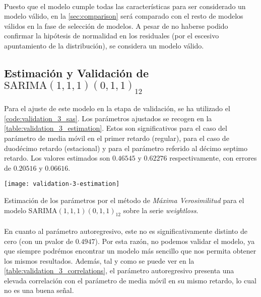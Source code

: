 \documentclass[a4paper, spanish]{article}
\begin{document}
      \paragraph{}
      Puesto que el modelo cumple todas las características para ser considerado un modelo válido, en la \autoref{sec:comparison} será comparado con el resto de modelos válidos en la fase de selección de modelos. A pesar de no haberse podido confirmar la hipótesis de normalidad en los residuales (por el escesivo apuntamiento de la distribución), se considera un modelo válido.

    \subsection{Estimación y Validación de \textbf{$\text{SARIMA}(1, 1, 1)(0, 1, 1)_{12}$}}
    \label{sec:fitting_3}

      \paragraph{}
      Para el ajuste de este modelo en la etapa de validación, se ha utilizado el \autoref{code:validation_3_sas}. Los parámetros ajustados se recogen en la \autoref{table:validation_3_estimation}. Estos son significativos para el caso del parámetro de media móvil en el primer retardo (regular), para el caso de duodécimo retardo (estacional) y para el parámetro referido al décimo septimo retardo. Los valores estimados son $0.46545$ y $0.62276$ respectivamente, con errores de $0.20516$ y $0.06616$.

      \begin{table}[htb!]
        \centering
        \texttt{[image: validation-3-estimation]}
        \caption{Estimación de los parámetros por el método de \emph{Máxima Verosimilitud} para el modelo $\text{SARIMA}(1, 1, 1)(0, 1, 1)_{12}$ sobre la serie \emph{weightloss}.}
        \label{table:validation_3_estimation}
      \end{table}

      \paragraph{}
      En cuanto al parámetro autoregresivo, este no es significativamente distinto de cero (con un pvalor de $0.4947$). Por esta razón, no podemos validar el modelo, ya que siempre podrémos encontrar un modelo más sencillo que nos permita obtener los mismos resultados. Además, tal y como se puede ver en la \autoref{table:validation_3_correlations}, el parámetro autoregresivo presenta una elevada correlación con el parámetro de media móvil en su mismo retardo, lo cual no es una buena señal.
\end{document}

